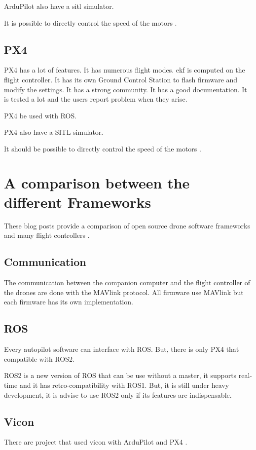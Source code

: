ArduPilot also have a \gls{sitl} simulator.

It is possible to directly control the speed of the motors \cite{github_ardupilot_11859}.

\subsection{PX4}
PX4 has a lot of features.
It has numerous flight modes.
\Gls{ekf} is computed on the flight controller.
It has its own Ground Control Station to flash firmware and modify the settings.
It has a strong community.
It has a good documentation.
It is tested a lot and the users report problem when they arise.

PX4 be used  with ROS.

PX4 also have a SITL simulator.

It should be possible to directly control the speed of the motors \cite{px4_low_level_control}.

\section{A comparison between the different Frameworks}
These blog posts provide a comparison of open source drone software frameworks \cite{drone_software_projects} and many flight controllers \cite{drone_flight_controllers}.

\subsection{Communication}
The communication between the companion computer and the flight controller of the drones are done with the MAVlink protocol. All firmware use MAVlink but each firmware has its own implementation.

\subsection{ROS}
Every autopilot software can interface with ROS. But, there is only PX4 that compatible with ROS2.

ROS2 is a new version of ROS that can be use without a master, it supports real-time and it has retro-compatibility with ROS1. But, it is still under heavy development, it is advise to use ROS2 only if its features are indispensable.

\subsection{Vicon}
There are project that used vicon with ArduPilot \cite{ardupilot_vicon} and PX4 \cite{px4_vicon}.

